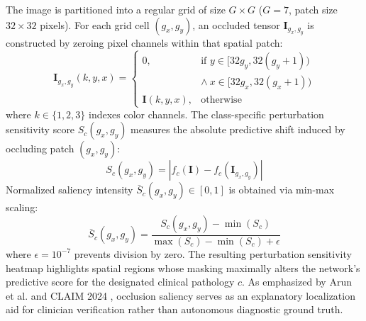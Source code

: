 \documentclass[journal,10pt,twocolumn]{IEEEtran}
\begin{document}
The image is partitioned into a regular grid of size $G \times G$ ($G=7$, patch size $32 \times 32$ pixels). For each grid cell $(g_x, g_y)$, an occluded tensor $\mathbf{I}_{g_x, g_y}$ is constructed by zeroing pixel channels within that spatial patch:
\begin{equation}
\mathbf{I}_{g_x, g_y}(k, y, x) = \begin{cases}
0, & \text{if } y \in [32 g_y, 32(g_y+1)) \\
   & \land \ x \in [32 g_x, 32(g_x+1)) \\
\mathbf{I}(k, y, x), & \text{otherwise}
\end{cases}
\end{equation}
where $k \in \{1, 2, 3\}$ indexes color channels. The class-specific perturbation sensitivity score $S_c(g_x, g_y)$ measures the absolute predictive shift induced by occluding patch $(g_x, g_y)$:
\begin{equation}
S_c(g_x, g_y) = \left| f_c(\mathbf{I}) - f_c(\mathbf{I}_{g_x, g_y}) \right|
\end{equation}
Normalized saliency intensity $\bar{S}_c(g_x, g_y) \in [0, 1]$ is obtained via min-max scaling:
\begin{equation}
\bar{S}_c(g_x, g_y) = \frac{S_c(g_x, g_y) - \min(S_c)}{\max(S_c) - \min(S_c) + \epsilon}
\end{equation}
where $\epsilon = 10^{-7}$ prevents division by zero. The resulting perturbation sensitivity heatmap highlights spatial regions whose masking maximally alters the network's predictive score for the designated clinical pathology $c$. As emphasized by Arun et al. \cite{arun2021assessing} and CLAIM 2024 \cite{claim2024}, occlusion saliency serves as an explanatory localization aid for clinician verification rather than autonomous diagnostic ground truth.
\end{document}
